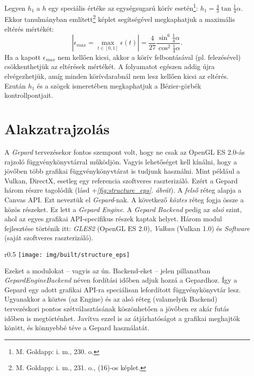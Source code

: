 \documentclass[12pt]{report}
\theoremstyle{definition}
\newcommand{\func}[1]{{\textsl{#1}}}
\newcommand{\melyikoldalra}{r}
\begin{document}
Legyen $h_1$ a $h$ egy speciális értéke az egységsugarú körív
esetén\footnote{M. Goldapp: i. m., 230. o.}: $h_1 = \frac{4}{3}
\tan{\frac{1}{4} \alpha}$. Ekkor
 tanulmányban
említett\footnote{M.  Goldapp: i. m., 231. o., (16)-os képlet.} képlet
segítségével megkaphatjuk a maximális eltérés mértékét: \begin{equation}
\label{eq:2} |\epsilon_{max} = \max_{{t\in[0, 1]}} \epsilon(t)| = \frac{4}{27}
\frac{\sin^6{\frac{1}{4} \alpha}}{\cos^2{\frac{1}{4} \alpha}}. \end{equation}
Ha a kapott $\epsilon_{max}$ nem kellően kicsi, akkor a körív felbontásával
(pl. felezésével) csökkenthetjük az eltérések mértékét. A folyamatot egészen
addig újra elvégezhetjük, amíg minden körívdarabnál nem lesz kellően kicsi
az eltérés. Ezután $h_1$ és a szögek ismeretében megkaphatjuk a Bézier-görbék
kontrollpontjait.



    \chapter{Alakzatrajzolás}

A \emph{Gepard} tervezésekor fontos szempont volt, hogy ne csak az OpenGL ES
2.0-ás rajzoló függvénykönyvtárral működjön. Vagyis lehetőséget kell kínálni,
hogy a jövőben több grafikai függvénykönyvtárat is tudjunk használni. Mint
például a Vulkan, DirectX, esetleg egy referencia szoftveres raszterizáló.
Ezért a Gepard három részre tagolódik (lásd \az+\emph{\ref{fig:structure_eps}.
ábrát}). A \emph{felső} réteg alapja a Canvas API. Ezt neveztük el
\emph{Gepard}-nak. A következő \emph{köztes} réteg fogja össze a közös
részeket. Ez lett a \emph{Gepard Engine}. A \emph{Gepard Backend} pedig az
\emph{alsó} szint, ahol az egyes grafikai API-specifikus részek kaptak
helyet. Három modul fejlesztése történik itt: \emph{GLES2} (OpenGL ES 2.0),
\emph{Vulkan} (Vulkan 1.0) és \emph{Software} (saját szoftveres raszterizáló).

  \begin{wrapfigure}{\melyikoldalra}{0.5\textwidth}
    \texttt{[image: img/built/structure\_eps]}
    \caption{\label{fig:structure_eps} A három fő réteg}
  \end{wrapfigure}
Ezeket a modulokat -- vagyis az ún. Backend-eket -- jelen pillanatban
\func{Gepard\-Engine\-Backend} néven fordítási időben adjuk hozzá a Gepardhoz. Így
a Gepard egy adott grafikai API-ra speciálisan lefordított függvénykönyvtár
lesz. Ugyanakkor a köztes (az Engine) és az alsó réteg (valamelyik Backend)
tervezéskori pontos szétválasztásának köszönhetően a jövőben ez akár futás
időben is megtörténhet. Javítva ezzel is az átjárhatóságot a grafikai meghajtók
között, és könnyebbé téve a Gepard használatát.
\end{document}
